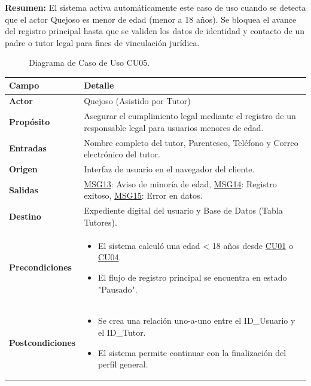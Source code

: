 \begin{appendices}
\textbf{Resumen:} 
El sistema activa automáticamente este caso de uso cuando se detecta que el actor Quejoso es menor de edad (menor a 18 años). Se bloquea el avance del registro principal hasta que se validen los datos de identidad y contacto de un padre o tutor legal para fines de vinculación jurídica.

\begin{figure}[htbp]
    \centering
    \figCUcinco
    \caption{Diagrama de Caso de Uso CU05.}
    \label{fig:cu05}
\end{figure}

\begin{table}[htbp]
\centering
\small
\begin{tabular}{|p{3.5cm}|p{10.5cm}|}
\hline
\rowcolor[HTML]{EFEFEF} 
\textbf{Campo} & \textbf{Detalle} \\ \hline
\textbf{Actor} & Quejoso (Asistido por Tutor) \\ \hline
\textbf{Propósito} & Asegurar el cumplimiento legal mediante el registro de un responsable legal para usuarios menores de edad. \\ \hline
\textbf{Entradas} & Nombre completo del tutor, Parentesco, Teléfono y Correo electrónico del tutor. \\ \hline
\textbf{Origen} & Interfaz de usuario en el navegador del cliente. \\ \hline
\textbf{Salidas} & \hyperlink{msg:MSG13}{MSG13}: Aviso de minoría de edad, \hyperlink{msg:MSG14}{MSG14}: Registro exitoso, \hyperlink{msg:MSG15}{MSG15}: Error en datos. \\ \hline
\textbf{Destino} & Expediente digital del usuario y Base de Datos (Tabla Tutores). \\ \hline
\textbf{Precondiciones} & 
\begin{itemize}[nosep, leftmargin=*]
    \item El sistema calculó una edad < 18 años desde \hyperlink{anexo:casos_uso}{CU01} o \hyperlink{anexo:casos_uso}{CU04}.
    \item El flujo de registro principal se encuentra en estado "Pausado".
\end{itemize} \\ \hline
\textbf{Postcondiciones} & 
\begin{itemize}[nosep, leftmargin=*]
    \item Se crea una relación uno-a-uno entre el ID\_Usuario y el ID\_Tutor.
    \item El sistema permite continuar con la finalización del perfil general.

\end{itemize}
\end{tabular}
\end{table}
\end{appendices}
